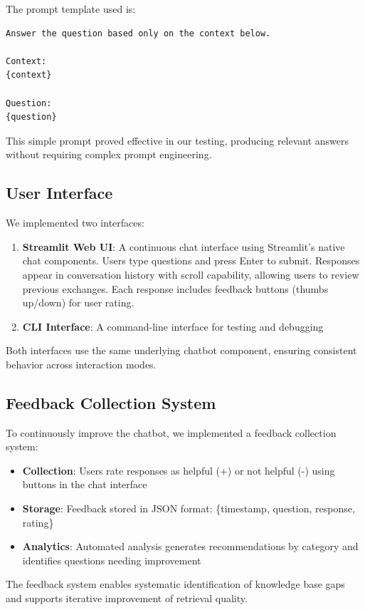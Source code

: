 \documentclass[conference]{IEEEtran}
\begin{document}
The prompt template used is:

{\small
\begin{verbatim}
Answer the question based only on the context below.

Context:
{context}

Question:
{question}
\end{verbatim}
}

This simple prompt proved effective in our testing, producing relevant answers without requiring complex prompt engineering.

\subsection{User Interface}
We implemented two interfaces:

\begin{enumerate}
    \item \textbf{Streamlit Web UI}: A continuous chat interface using Streamlit's native chat components. Users type questions and press Enter to submit. Responses appear in conversation history with scroll capability, allowing users to review previous exchanges. Each response includes feedback buttons (thumbs up/down) for user rating.
    \item \textbf{CLI Interface}: A command-line interface for testing and debugging
\end{enumerate}

Both interfaces use the same underlying chatbot component, ensuring consistent behavior across interaction modes.

\subsection{Feedback Collection System}
To continuously improve the chatbot, we implemented a feedback collection system:

\begin{itemize}
    \item \textbf{Collection}: Users rate responses as helpful (+) or not helpful (-) using buttons in the chat interface
    \item \textbf{Storage}: Feedback stored in JSON format: \{timestamp, question, response, rating\}
    \item \textbf{Analytics}: Automated analysis generates recommendations by category and identifies questions needing improvement
\end{itemize}

The feedback system enables systematic identification of knowledge base gaps and supports iterative improvement of retrieval quality.
\end{document}
